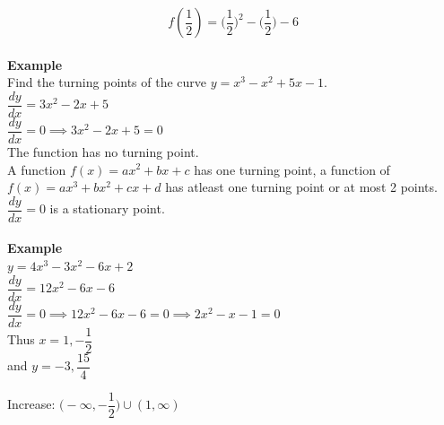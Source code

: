 \documentclass[11pt,a4paper]{article}
\begin{document}
$$f(\frac{1}{2})=\bigg(\dfrac{1}{2}\bigg)^2-\bigg(\dfrac{1}{2}\bigg)-6$$\\



\textbf{Example}\\
Find the turning points of the curve $y=x^3-x^2+5x-1$.\\

$\dfrac{dy}{dx}=3x^2-2x+5$\\

$\dfrac{dy}{dx}=0\implies 3x^2-2x+5=0$\\

The function has no turning point.\\


A function $f(x)=ax^2+bx+c$ has one turning point, a function of $f(x)=ax^3+bx^2+cx+d$ has atleast one turning point or at most 2 points. $\dfrac{dy}{dx}=0$ is a stationary point.\\\\


\textbf{Example}\\

$y=4x^3-3x^2-6x+2$\\

$\dfrac{dy}{dx}=12x^2-6x-6$\\

$\dfrac{dy}{dx}=0\implies 12x^2-6x-6=0\implies 2x^2-x-1=0$\\

Thus $x=1,-\dfrac{1}{2}$\\

and $y=-3, \dfrac{15}{4}$\\



\begin{figure}[H]
\centering
{}
\end{figure}

Increase: $\bigg(-\infty,-\dfrac{1}{2}\bigg)\cup (1,\infty)$\\
\end{document}
